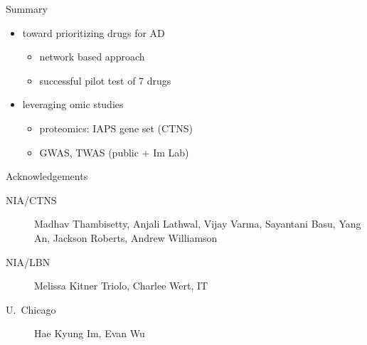 \documentclass[aspectratio=169]{beamer}
\begin{document}


\begin{frame}{Summary}
\begin{itemize}
\item toward prioritizing drugs for AD
\begin{itemize}
\item network based approach\\
\item successful pilot test of 7 drugs
\end{itemize}
\item leveraging omic studies
\begin{itemize}
\item proteomics: IAPS gene set (CTNS)
\item GWAS, TWAS (public + Im Lab)
\end{itemize}
\end{itemize}
\end{frame}

\begin{frame}{Acknowledgements}
\begin{description}
\item[NIA/CTNS] Madhav Thambisetty, Anjali Lathwal, Vijay Varma, Sayantani
	Basu, Yang An, Jackson Roberts, Andrew Williamson
\item[NIA/LBN] Melissa Kitner Triolo, Charlee Wert, IT
\item[U.~Chicago] Hae Kyung Im, Evan Wu
\end{description}
\end{frame}
\end{document}
